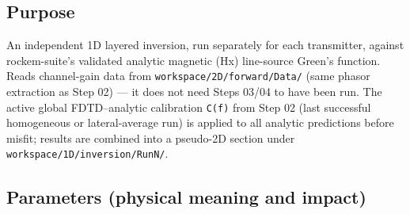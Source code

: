 \documentclass[11pt,a4paper]{article}
\begin{document}
\subsection{Purpose}

An independent 1D layered inversion, run separately for each transmitter, against rockem-suite's validated analytic magnetic (Hx) line-source Green's function. Reads channel-gain data from \texttt{workspace/2D/forward/Data/} (same phasor extraction as Step 02) — it does not need Steps 03/04 to have been run. The active global FDTD--analytic calibration \texttt{C(f)} from Step 02 (last successful homogeneous or lateral-average run) is applied to all analytic predictions before misfit; results are combined into a pseudo-2D section under \texttt{workspace/1D/inversion/RunN/}.

\subsection{Parameters (physical meaning and impact)}
\end{document}
